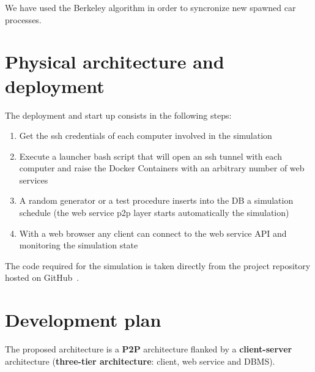We have used the Berkeley algorithm in order to syncronize new spawned car processes.


\section{Physical architecture and deployment}

The deployment and start up consists in the following steps:
\begin{enumerate}
    \item Get the ssh credentials of each computer involved in the simulation
    \item Execute a launcher bash script that will open an ssh tunnel with each computer and 
        raise the Docker Containers with an arbitrary number of web services 
    \item A random generator or a test procedure inserts into the DB a simulation schedule
        (the web service p2p layer starts automatically the simulation)
    \item With a web browser any client can connect to the web service API and monitoring 
        the simulation state   
\end{enumerate}

The code required for the simulation is taken directly from the project repository hosted on 
GitHub~\cite{2}.


\section{Development plan}

The proposed architecture is a \textbf{P2P} architecture flanked by a 
\textbf{client-server} architecture (\textbf{three-tier architecture}: client, web service and DBMS).
